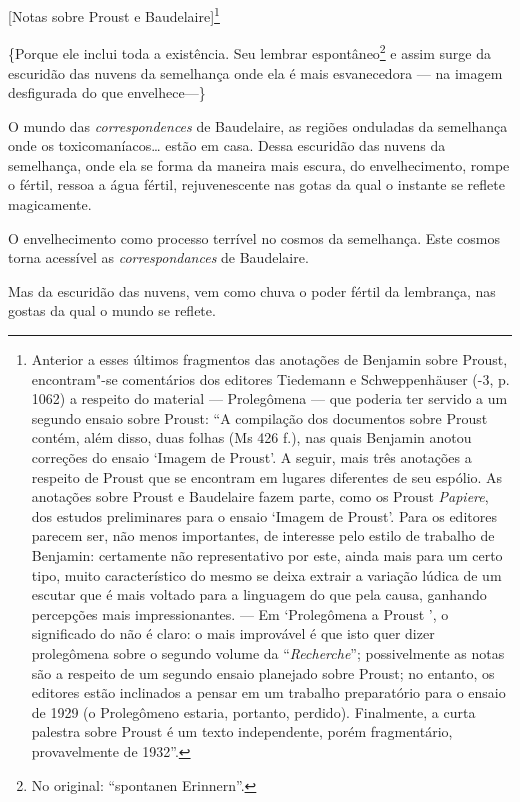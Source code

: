 {[}Notas sobre Proust e Baudelaire{]}\footnote{Anterior a esses
  últimos fragmentos das anotações de Benjamin sobre Proust,
  encontram"-se comentários dos editores Tiedemann e Schweppenhäuser
  (-3, p. 1062) a respeito do material --- Prolegômena ---
  que poderia ter servido a um segundo ensaio sobre Proust: ``A
  compilação dos documentos sobre Proust contém, além disso, duas folhas
  (Ms 426 f.), nas quais Benjamin anotou correções do ensaio
  `Imagem de Proust'. A seguir, mais três anotações a respeito de
  Proust que se encontram em lugares diferentes de seu espólio. As
  anotações sobre Proust e Baudelaire fazem parte, como os Proust
  \emph{Papiere}, dos estudos preliminares para o ensaio `Imagem de
    Proust'. Para os editores parecem ser, não menos importantes, de
  interesse pelo estilo de trabalho de Benjamin: certamente não
  representativo por este, ainda mais para um certo tipo, muito
  característico do mesmo se deixa extrair a variação lúdica de um
  escutar que é mais voltado para a linguagem do que pela causa,
  ganhando percepções mais impressionantes. --- Em `Prolegômena a Proust
  ', o significado do  não é claro: o mais improvável é que isto
  quer dizer prolegômena sobre o segundo volume da ``\emph{Recherche}'';
  possivelmente as notas são a respeito de um segundo ensaio planejado
  sobre Proust; no entanto, os editores estão inclinados a pensar em um
  trabalho preparatório para o ensaio de 1929 (o Prolegômeno  estaria,
  portanto, perdido). Finalmente, a curta palestra sobre Proust é um
  texto independente, porém fragmentário, provavelmente de 1932''. \versal{[N. E.]}}

\{Porque ele inclui toda a existência. Seu lembrar espontâneo\footnote{No original: ``spontanen Erinnern''. \versal{[N. T.]}} e assim surge da escuridão das
nuvens da semelhança onde ela é mais esvanecedora --- na imagem
desfigurada do que envelhece---\}

O mundo das \emph{correspondences} de Baudelaire, as regiões onduladas
da semelhança onde os toxicomaníacos\ldots{} estão em casa. Dessa escuridão
das nuvens da semelhança, onde ela se forma da maneira mais escura, do
envelhecimento, rompe o fértil, ressoa a água fértil, rejuvenescente nas
gotas da qual o instante se reflete magicamente.

O envelhecimento como processo terrível no cosmos da semelhança. Este
cosmos torna acessível as \emph{correspondances} de Baudelaire.

Mas da escuridão das nuvens, vem como chuva o poder fértil da lembrança,
nas gostas da qual o mundo se reflete.

